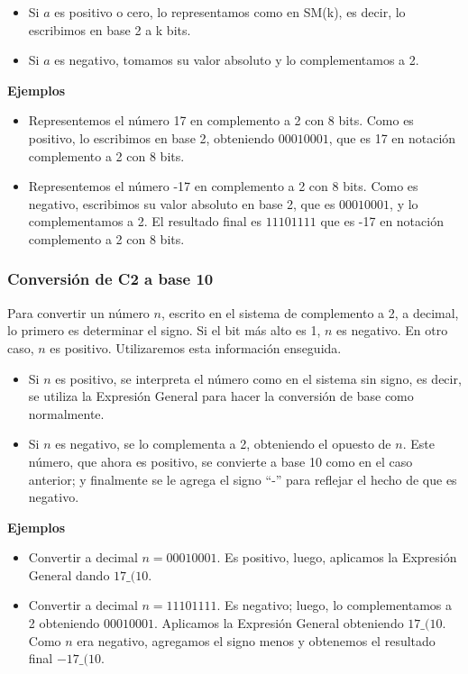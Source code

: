 \documentclass[spanish,A4,]{article}
\begin{document}
\begin{itemize}
\itemsep1pt\parskip0pt
\item
  Si $a$ es positivo o cero, lo representamos como en SM(k), es decir,
  lo escribimos en base 2 a k bits.
\item
  Si $a$ es negativo, tomamos su valor absoluto y lo complementamos a 2.
\end{itemize}

\textbf{Ejemplos}

\begin{itemize}
\itemsep1pt\parskip0pt
\item
  Representemos el número 17 en complemento a 2 con 8 bits. Como es
  positivo, lo escribimos en base 2, obteniendo $00010001$, que es 17 en
  notación complemento a 2 con 8 bits.
\item
  Representemos el número -17 en complemento a 2 con 8 bits. Como es
  negativo, escribimos su valor absoluto en base 2, que es $00010001$, y
  lo complementamos a 2. El resultado final es $11101111$ que es -17 en
  notación complemento a 2 con 8 bits.
\end{itemize}

\subsubsection{Conversión de C2 a base
10}\label{conversiuxf3n-de-c2-a-base-10}

Para convertir un número $n$, escrito en el sistema de complemento a 2,
a decimal, lo primero es determinar el signo. Si el bit más alto es 1,
$n$ es negativo. En otro caso, $n$ es positivo. Utilizaremos esta
información enseguida.

\begin{itemize}
\itemsep1pt\parskip0pt
\item
  Si $n$ es positivo, se interpreta el número como en el sistema sin
  signo, es decir, se utiliza la Expresión General para hacer la
  conversión de base como normalmente.
\item
  Si $n$ es negativo, se lo complementa a 2, obteniendo el opuesto de
  $n$. Este número, que ahora es positivo, se convierte a base 10 como
  en el caso anterior; y finalmente se le agrega el signo ``-'' para
  reflejar el hecho de que es negativo.
\end{itemize}

\textbf{Ejemplos}

\begin{itemize}
\itemsep1pt\parskip0pt
\item
  Convertir a decimal $n = 00010001$. Es positivo, luego, aplicamos la
  Expresión General dando $17\_{(10}$.
\item
  Convertir a decimal $n = 11101111$. Es negativo; luego, lo
  complementamos a 2 obteniendo $00010001$. Aplicamos la Expresión
  General obteniendo $17\_{(10}$. Como $n$ era negativo, agregamos el
  signo menos y obtenemos el resultado final $-17\_{(10}$.
\end{itemize}
\end{document}
